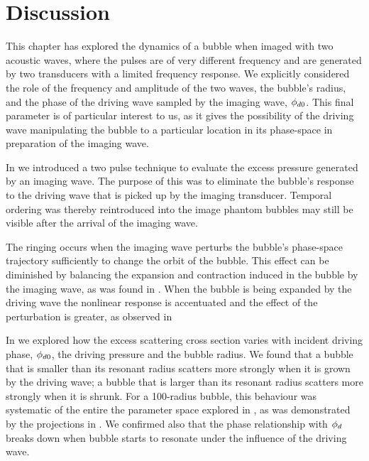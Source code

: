

\section{Discussion}

This chapter has explored the dynamics of a bubble when imaged with two acoustic waves,
where the pulses are of very different frequency and are generated by two transducers 
with a limited frequency response.
We explicitly considered the role of the frequency and amplitude of the two waves,
the bubble's radius,
and the phase of the driving wave sampled by the imaging wave, ${\phi_{d0}}$.
This final parameter is of particular interest to us,
as it gives the possibility of the driving wave manipulating the bubble to a particular
location in its phase-space in preparation of the imaging wave.



In  we introduced a two pulse technique
to evaluate the excess pressure generated by an imaging wave.
The purpose of this was to eliminate the bubble's response to the driving wave
that is picked up by the imaging transducer.
Temporal ordering was thereby reintroduced into the image phantom bubbles may still be visible after
the arrival of the imaging wave.

The ringing occurs when the imaging wave perturbs the bubble's phase-space trajectory 
sufficiently to change the orbit of the bubble.
This effect can be diminished by balancing the expansion and contraction induced in the bubble
by the imaging wave, as was found in .
When the bubble is being expanded  by the driving wave the nonlinear response is accentuated 
and the effect of the perturbation is greater,  as observed in 

In  we explored how the excess scattering cross section varies with incident driving phase, ${\phi_{d0}}$,
the driving pressure and the bubble radius.
We found that  a bubble that is smaller than its resonant radius 
scatters more strongly when it is grown by the driving wave;
a bubble that is larger than its resonant radius scatters more strongly when it is shrunk.
For a \unit{100}\nano\metre-radius bubble, this behaviour was systematic of the entire  the parameter space explored
in , 
as was demonstrated by the projections in .
We confirmed also that the phase relationship with ${\phi_d}$ breaks down when 
bubble starts to resonate under the influence of the driving wave.


